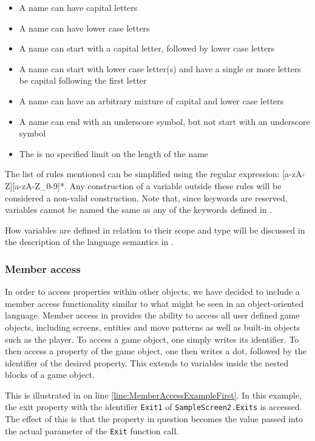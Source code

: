 \begin{itemize}
    \item A name can have capital letters
    \item A name can have lower case letters
    \item A name can start with a capital letter, followed by lower case letters
    \item A name can start with lower case letter(s) and have a single or more letters be capital following the first letter
    \item A name can have an arbitrary mixture of capital and lower case letters
    \item A name can end with an underscore symbol, but not start with an underscore symbol
    \item The is no specified limit on the length of the name
\end{itemize}

The list of rules mentioned can be simplified using the regular expression: [a-zA-Z][a-zA-Z\_0-9]*. Any construction of a variable outside these rules will be considered
a non-valid construction. Note that, since keywords are reserved, variables cannot be named the same as any of the keywords defined in .

How variables are defined in relation to their scope and type will be discussed in the description of the language semantics in .

\subsubsection*{Member access}
In order to access properties within other objects, we have decided to include a member access functionality similar to what might be seen in an
object-oriented language. Member access in \dazel{} provides the ability to access all user defined game objects, including screens, entities and move patterns as well
as built-in objects such as the player. To access a game object, one simply writes its identifier. To then access a property of the game object, one then writes
a dot, followed by the identifier of the desired property. This extends to variables inside the nested blocks of a game object.

This is illustrated in  on line \ref{line:MemberAccessExampleFirst}. In this example, the exit property with the identifier \texttt{Exit1} of \texttt{SampleScreen2.Exits} is accessed.
The effect of this is that the property in question becomes the value passed into the actual parameter of the \texttt{Exit} function call.

